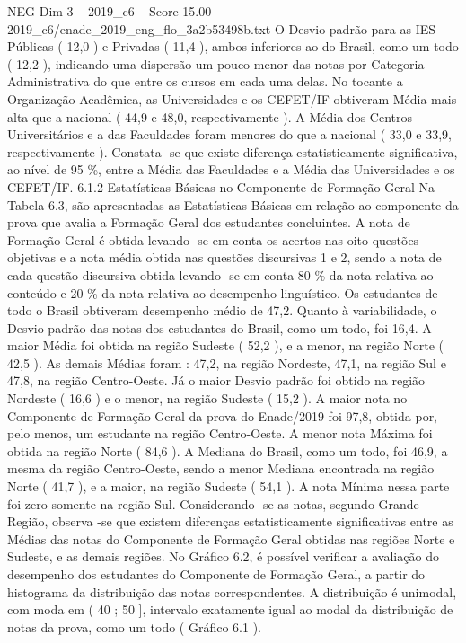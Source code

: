 \begin{textsample}{NEG Dim 3 – 2019\_c6 – Score 15.00 – 2019\_c6/enade\_2019\_eng\_flo\_3a2b53498b.txt}
O Desvio padrão para as IES Públicas ( 12,0 ) e Privadas ( 11,4 ), ambos inferiores ao do Brasil, como um todo ( 12,2 ), indicando uma dispersão um pouco menor das notas por Categoria Administrativa do que entre os cursos em cada uma delas.
No tocante a Organização Acadêmica, as Universidades e os CEFET/IF obtiveram Média mais alta que a nacional ( 44,9 e 48,0, respectivamente ).
A Média dos Centros Universitários e a das Faculdades foram menores do que a nacional ( 33,0 e 33,9, respectivamente ).
Constata -se que existe diferença estatisticamente significativa, ao nível de 95 \%, entre a Média das Faculdades e a Média das Universidades e os CEFET/IF. 6.1.2 Estatísticas Básicas no Componente de Formação Geral Na Tabela 6.3, são apresentadas as Estatísticas Básicas em relação ao componente da prova que avalia a Formação Geral dos estudantes concluintes.
A nota de Formação Geral é obtida levando -se em conta os acertos nas oito questões objetivas e a nota média obtida nas questões discursivas 1 e 2, sendo a nota de cada questão discursiva obtida levando -se em conta 80 \% da nota relativa ao conteúdo e 20 \% da nota relativa ao desempenho linguístico.
Os estudantes de todo o Brasil obtiveram desempenho médio de 47,2.
Quanto à variabilidade, o Desvio padrão das notas dos estudantes do Brasil, como um todo, foi 16,4.
A maior Média foi obtida na região Sudeste ( 52,2 ), e a menor, na região Norte ( 42,5 ).
As demais Médias foram : 47,2, na região Nordeste, 47,1, na região Sul e 47,8, na região Centro-Oeste.
Já o maior Desvio padrão foi obtido na região Nordeste ( 16,6 ) e o menor, na região Sudeste ( 15,2 ).
A maior nota no Componente de Formação Geral da prova do Enade/2019 foi 97,8, obtida por, pelo menos, um estudante na região Centro-Oeste.
A menor nota Máxima foi obtida na região Norte ( 84,6 ).
A Mediana do Brasil, como um todo, foi 46,9, a mesma da região Centro-Oeste, sendo a menor Mediana encontrada na região Norte ( 41,7 ), e a maior, na região Sudeste ( 54,1 ).
A nota Mínima nessa parte foi zero somente na região Sul.
Considerando -se as notas, segundo Grande Região, observa -se que existem diferenças estatisticamente significativas entre as Médias das notas do Componente de Formação Geral obtidas nas regiões Norte e Sudeste, e as demais regiões.
No Gráfico 6.2, é possível verificar a avaliação do desempenho dos estudantes do Componente de Formação Geral, a partir do histograma da distribuição das notas correspondentes.
A distribuição é unimodal, com moda em ( 40 ; 50 ], intervalo exatamente igual ao modal da distribuição de notas da prova, como um todo ( Gráfico 6.1 ).

\end{textsample}
